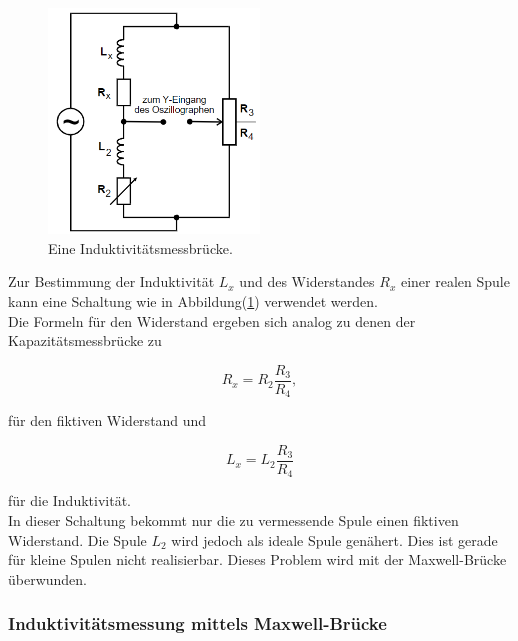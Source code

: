             \begin{figure}[ht]
                \centering
                \includegraphics[width=0.5\textwidth]{latex/images/Spule.PNG}
                \caption{Eine Induktivitätsmessbrücke\protect \cite{V302}.}
                \label{img:Spul}
            \end{figure}

            \noindent Zur Bestimmung der Induktivität $L_x$ und des Widerstandes $R_x$ einer realen Spule kann eine Schaltung wie in 
            Abbildung(\ref{img:Spul}) verwendet werden.\\ Die Formeln für den Widerstand ergeben sich analog zu denen der Kapazitätsmessbrücke zu 

            \begin{equation*}
                R_x = R_2 \frac{R_3}{R_4},
            \end{equation*}

            \noindent für den fiktiven Widerstand und 

            \begin{equation*}
                L_x = L_2 \frac{R_3}{R_4}
            \end{equation*}

            \noindent für die Induktivität.\\ In dieser Schaltung bekommt nur die zu vermessende Spule einen fiktiven Widerstand. Die Spule 
            $L_2$ wird jedoch als ideale Spule genähert. Dies ist gerade für kleine Spulen nicht realisierbar. Dieses Problem wird mit der 
            Maxwell-Brücke überwunden.

        \subsubsection{Induktivitätsmessung mittels Maxwell-Brücke}

